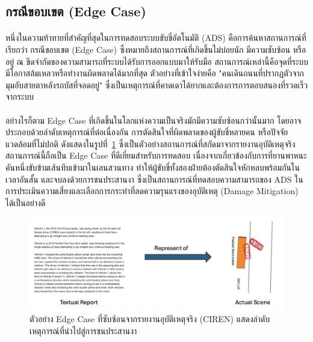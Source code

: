 \subsection{กรณีขอบเขต (Edge Case)}
\paragraph{}
หนึ่งในความท้าทายที่สำคัญที่สุดในการทดสอบระบบขับขี่อัตโนมัติ (ADS) คือการค้นหาสถานการณ์ที่เรียกว่า กรณีขอบเขต (Edge Case) ซึ่งหมายถึงสถานการณ์ที่เกิดขึ้นไม่บ่อยนัก มีความซับซ้อน หรืออยู่ ณ ขีดจำกัดของความสามารถที่ระบบได้รับการออกแบบมาให้รับมือ \cite{koopman2017autonomous} สถานการณ์เหล่านี้คือจุดที่ระบบมีโอกาสล้มเหลวหรือทำงานผิดพลาดได้มากที่สุด ตัวอย่างที่เข้าใจง่ายคือ "คนเดินถนนที่ปรากฏตัวจากมุมอับสายตาหลังรถบัสที่จอดอยู่" ซึ่งเป็นเหตุการณ์ที่คาดเดาได้ยากและต้องการการตอบสนองที่รวดเร็วจากระบบ

\paragraph{}
อย่างไรก็ตาม Edge Case ที่เกิดขึ้นในโลกแห่งความเป็นจริงมักมีความซับซ้อนกว่านั้นมาก โดยอาจประกอบด้วยลำดับเหตุการณ์ที่ต่อเนื่องกัน การตัดสินใจที่ผิดพลาดของผู้ขับขี่หลายคน หรือปัจจัยแวดล้อมที่ไม่ปกติ ดังแสดงในรูปที่~\ref{fig:edge_case_example} ซึ่งเป็นตัวอย่างสถานการณ์ที่สกัดมาจากรายงานอุบัติเหตุจริง สถานการณ์นี้ถือเป็น Edge Case ที่ดีเยี่ยมสำหรับการทดสอบ เนื่องจากเกี่ยวข้องกับการที่ยานพาหนะคันหนึ่งขับข้ามเส้นทึบเข้ามาในเลนสวนทาง ทำให้ผู้ขับขี่ทั้งสองฝ่ายต้องตัดสินใจหักหลบพร้อมกันในเวลาอันสั้น และจบลงด้วยการชนประสานงา ซึ่งเป็นสถานการณ์ที่ทดสอบความสามารถของ ADS ในการประเมินความเสี่ยงและเลือกการกระทำที่ลดความรุนแรงของอุบัติเหตุ (Damage Mitigation) ได้เป็นอย่างดี

\begin{figure}[htbp]
    \centering
    \includegraphics[width=1\textwidth]{images/edge-case-example}
    \caption{ตัวอย่าง Edge Case ที่ซับซ้อนจากรายงานอุบัติเหตุจริง (CIREN) แสดงลำดับเหตุการณ์ที่นำไปสู่การชนประสานงา}
    \label{fig:edge_case_example}
\end{figure}

